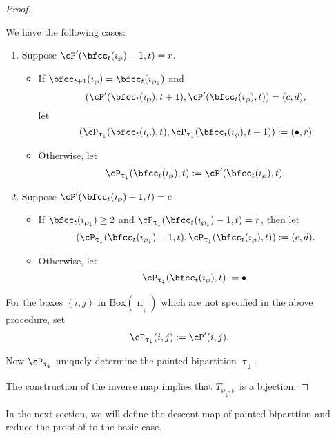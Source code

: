 \documentclass[12pt,a4paper]{amsart}
\def\PPm{\wp_{\downarrow}}
\def\uptaum{\uptau_{\downarrow}}
\numberwithin{equation}{section}
\theoremstyle{remark}
\newcommand{\BOX}[1]{\mathrm{Box}(#1)}
\begin{document}
\begin{proof}
{\begin{description}
           \def\xxn{\cP_{\uptaum}(\bfcc_t(\imath_{\PPm})-1,t)} %
           \def\xxo{\cP_{\uptaum}(\bfcc_t(\imath_{\wp}),t)} %
           \def\xxd{\cP_{\uptaum}(\bfcc_t(\imath_{\wp}),t+1)} %
           \def\yyn{\cP'(\bfcc_t(\imath_{\PPm})-1,t)} %
           \def\yyo{\cP'(\bfcc_t(\imath_{\wp})-1,t)} %
           \def\yyt{\cP'(\bfcc_t(\imath_{\wp}),t)} %
           \def\yyd{\cP'(\bfcc_t(\imath_{\wp}),t+1)} %
           We have the following cases:
           \begin{enumerate}[label=(\alph*)]
             \item Suppose $\yyo=r$.
             \begin{itemize}
               \item If $\bfcc_{t+1}(\imath_{\wp}) = \bfcc_{t}(\imath_{\PPm})$
               and
               \[
                 (\yyd,\yyt) = (c,d),
               \]
               let
               \[
                 (\xxo,\xxd):=(\bullet, r)
               \]
               \item Otherwise, let \[
                 \xxo:=\yyt.
               \]
             \end{itemize}
             \item Suppose $\yyo=c$
             \begin{itemize}
               \item If $\bfcc_{t}(\imath_{\PPm})\geq 2$ and $\xxn=r$,
               then let
               \[
                 (\xxn,\xxo):=(c,d).
               \]
               \item Otherwise, let
               \[
                 \xxo :=\bullet.
               \]
             \end{itemize}
           \end{enumerate}
           For the boxes $(i,j)$ in $\BOX{\imath_{\uptaum}}$ which are not specified
           in the above procedure, set
           \[
           \cP_{\uptaum}(i,j):=\cP'(i,j).
           \]
     \item[STEP 3]
           Now $\cP_{\uptaum}$ uniquely determine the painted bipartition
           $\uptaum$.
   \end{description}
   The construction of the inverse map implies that $T_{\PPm,\wp}$ is a
   bijection.
 }

\end{proof}

In the next section, we will define the descent map of painted biparttion and reduce the proof of
 to the basic case.
\end{document}
